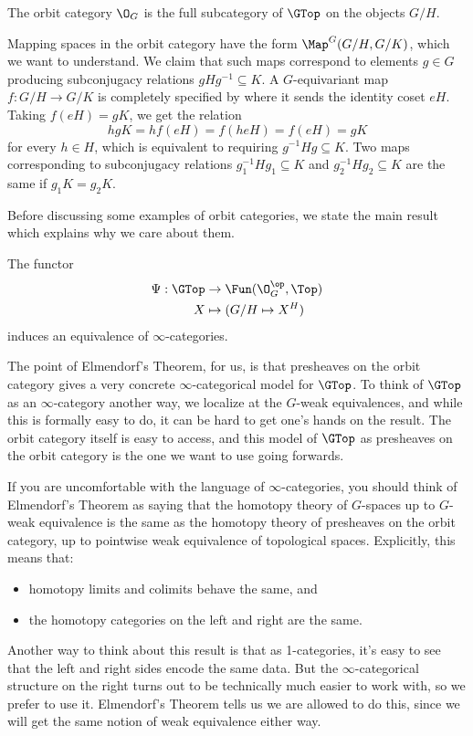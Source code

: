 \begin{defn}
    The orbit category $\O_G$ is the full subcategory of $\GTop$ on the objects $G/H$.
\end{defn}

Mapping spaces in the orbit category have the form $\Map^G(G/H, G/K)$, which we want to understand. We claim that such maps correspond to elements $g \in G$ producing subconjugacy relations $gHg^{-1} \subseteq K$. A $G$-equivariant map $f: G/H \to G/K$ is completely specified by where it sends the identity coset $eH$. Taking $f(eH) = gK$, we get the relation 
\[hgK = hf(eH) = f(heH) = f(eH) = gK\]
for every $h \in H$, which is equivalent to requiring $g^{-1}Hg \subseteq K$. Two maps corresponding to subconjugacy relations $g_1^{-1}Hg_1 \subseteq K$ and $g_2^{-1}Hg_2 \subseteq K$ are the same if $g_1K = g_2K$.

Before discussing some examples of orbit categories, we state the main result which explains why we care about them. 

\begin{thm}[Elmendorf]\label{thm: Elmendorf}
    The functor 
    \begin{align*} \Psi: \GTop &\to \Fun(\O_G^{\op}, \Top)\\
            X &\mapsto (G/H \mapsto X^H) 
    \end{align*}
    induces an equivalence of $\infty$-categories. 
\end{thm}

The point of Elmendorf's Theorem, for us, is that presheaves on the orbit category gives a very concrete $\infty$-categorical model for $\GTop$. To think of $\GTop$ as an $\infty$-category another way, we localize at the $G$-weak equivalences, and while this is formally easy to do, it can be hard to get one's hands on the result. The orbit category itself is easy to access, and this model of $\GTop$ as presheaves on the orbit category is the one we want to use going forwards. 

\begin{remark}
    If you are uncomfortable with the language of $\infty$-categories, you should think of Elmendorf's Theorem as saying that the homotopy theory of $G$-spaces up to $G$-weak equivalence is the same as the homotopy theory of presheaves on the orbit category, up to pointwise weak equivalence of topological spaces. Explicitly, this means that:
    \begin{itemize}
        \item homotopy limits and colimits behave the same, and
        \item the homotopy categories on the left and right are the same.
    \end{itemize}
    Another way to think about this result is that as 1-categories, it's easy to see that the left and right sides encode the same data. But the $\infty$-categorical structure on the right turns out to be technically much easier to work with, so we prefer to use it. Elmendorf's Theorem tells us we are allowed to do this, since we will get the same notion of weak equivalence either way.
\end{remark}

